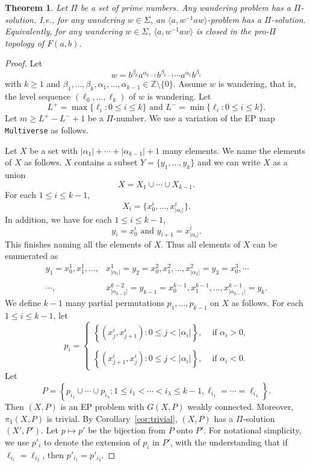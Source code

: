 \documentclass[11pt]{amsart}
\newtheorem{theorem}{Theorem}[section]
\theoremstyle{definition}
\theoremstyle{definition}
\numberwithin{equation}{section}
\begin{document}
\begin{theorem}\label{thm:wandering} Let $\Pi$ be a set of prime numbers. Any wandering problem has a $\Pi$-solution. I.e., for any wandering $w\in \Sigma$, an $\langle a, w^{-1}aw\rangle$-problem has a $\Pi$-solution. Equivalently, for any wandering $w\in \Sigma$, $\langle a, w^{-1}aw\rangle$ is closed in the pro-$\Pi$ topology of $F(a,b)$.
\end{theorem}

\begin{proof} Let 
$$w=b^{\beta_k}a^{\alpha_{k-1}}b^{\beta_{k-1}}\cdots a^{\alpha_1}b^{\beta_1} $$
with $k\geq 1$ and $\beta_1,\dots, \beta_k, \alpha_1, \dots, \alpha_{k-1}\in \mathbb{Z}\setminus\{0\}$. Assume $w$ is wandering, that is, the level sequence $(\ell_0,\dots, \ell_k)$ of $w$ is wandering. Let 
$$ L^+=\max\{\ell_i\colon 0\leq i\leq k\} \mbox{ and } L^-=\min\{\ell_i\colon 0\leq i\leq k\}. $$
Let $m\geq L^+-L^-+1$ be a $\Pi$-number. We use a variation of the EP map {\tt Multiverse} as follows. 

Let $X$ be a set with $|\alpha_1|+\cdots+|\alpha_{k-1}|+1$ many elements. We name the elements of $X$ as follows. $X$ contains a subset $Y=\{y_1,\dots, y_k\}$ and we can write $X$ as a union
$$ X=X_1\cup \cdots \cup X_{k-1}. $$
For each $1\leq i\leq k-1$, 
$$X_i=\{x^i_0,\dots, x^i_{|\alpha_i|}\}. $$
In addition, we have for each $1\leq i\leq k-1$,
$$ y_i=x^i_0 \mbox{ and } y_{i+1}=x^i_{|\alpha_i|}. $$
This finishes naming all the elements of $X$. Thus all elements of $X$ can be enumerated as
$$\begin{array}{rl} y_1=x^1_0, x^1_1,\dots, &\!\!\!\!x^1_{|\alpha_1|}=y_2=x^2_0, x^2_1,\dots, x^2_{|\alpha_2|}=y_3=x^3_0,\cdots \\ \\
 \cdots, &\!\!\!\!x^{k-2}_{|\alpha_{k-2}|}=y_{k-1}=x^{k-1}_0, x^{k-1}_1,\dots,  x^{k-1}_{|\alpha_{k-1}|}=y_k. 
\end{array}$$
We define $k-1$ many partial permutations $p_1,\dots, p_{k-1}$ on $X$ as follows. For each $1\leq i\leq k-1$, let
$$ p_i=\left\{\begin{array}{ll}\left\{ (x^i_j, x^i_{j+1})\colon 0\leq j<|\alpha_i|\right\}, & \mbox{ if $\alpha_i>0$,} \\ \\
\left\{ (x^i_{j+1}, x^i_j)\colon 0\leq j<|\alpha_i|\right\}, & \mbox{ if $\alpha_i<0$.} 
\end{array}\right.
$$
Let 
$$P=\left\{p_{i_1}\cup \cdots \cup p_{i_\lambda}\colon 1\leq i_1<\cdots<i_\lambda\leq k-1, \ell_{i_1}=\cdots=\ell_{i_\lambda}\right\}. $$
 Then $(X, P)$ is an EP problem with $G(X, P)$ weakly connected. Moreover, $\pi_1(X, P)$ is trivial. By Corollary~\ref{cor:trivial}, $(X,P)$ has a $\Pi$-solution $(X', P')$. Let $p\mapsto p'$ be the bijection from $P$ onto $P'$. For notational simplicity, we use $p'_i$ to denote the extension of $p_i$ in $P'$, with the understanding that if $\ell_{i_1}=\ell_{i_2}$, then $p'_{i_1}=p'_{i_2}$.


\end{proof}
\end{document}
